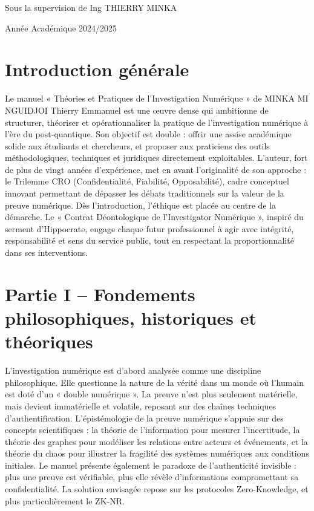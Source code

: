 \documentclass[12pt, a4paper]{article}
\begin{document}
\begin{titlepage}
    \vspace{1cm}
	\begin{Large}
	Sous la supervision de Ing THIERRY MINKA
	\end{Large}
    
    \vspace{1cm}
	\begin{Large}
	Année Académique 2024/2025
	\end{Large}

\end{titlepage}

\begin{Large}

\begin{Large}

\section*{Introduction générale}

Le manuel « Théories et Pratiques de l'Investigation Numérique » de MINKA MI NGUIDJOI Thierry Emmanuel est une œuvre dense qui ambitionne de structurer, théoriser et opérationnaliser la pratique de l'investigation numérique à l'ère du post-quantique. Son objectif est double : offrir une assise académique solide aux étudiants et chercheurs, et proposer aux praticiens des outils méthodologiques, techniques et juridiques directement exploitables. L'auteur, fort de plus de vingt années d'expérience, met en avant l'originalité de son approche : le Trilemme CRO (Confidentialité, Fiabilité, Opposabilité), cadre conceptuel innovant permettant de dépasser les débats traditionnels sur la valeur de la preuve numérique. Dès l'introduction, l'éthique est placée au centre de la démarche. Le « Contrat Déontologique de l'Investigator Numérique », inspiré du serment d'Hippocrate, engage chaque futur professionnel à agir avec intégrité, responsabilité et sens du service public, tout en respectant la proportionnalité dans ses interventions.

\section*{Partie I -- Fondements philosophiques, historiques et théoriques}

L'investigation numérique est d'abord analysée comme une discipline philosophique. Elle questionne la nature de la vérité dans un monde où l'humain est doté d'un « double numérique ». La preuve n'est plus seulement matérielle, mais devient immatérielle et volatile, reposant sur des chaînes techniques d'authentification. L'épistémologie de la preuve numérique s'appuie sur des concepts scientifiques : la théorie de l'information pour mesurer l'incertitude, la théorie des graphes pour modéliser les relations entre acteurs et événements, et la théorie du chaos pour illustrer la fragilité des systèmes numériques aux conditions initiales. Le manuel présente également le paradoxe de l'authenticité invisible : plus une preuve est vérifiable, plus elle révèle d'informations compromettant sa confidentialité. La solution envisagée repose sur les protocoles Zero-Knowledge, et plus particulièrement le ZK-NR.


\end{Large}
\end{Large}
\end{document}
